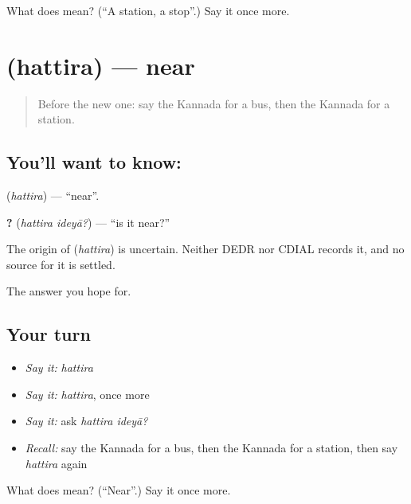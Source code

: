 \begin{tcolorbox}[breakable,colback=teal!4,colframe=teal!35!black,title={Before you move on}]
What does  mean? (\textquotedblleft{}A station, a stop\textquotedblright{}.) Say it once more.
\end{tcolorbox}
\section[\texorpdfstring{\kn{ಹತ್ತಿರ} (hattira)}{ಹತ್ತಿರ (hattira)}]{ (hattira) — near}

\label{lesson:KA-C100-near}



\begin{quote}
Before the new one: say the Kannada for a bus, then the Kannada for a station.
\end{quote}

\subsection*{You'll want to know: }
\textbf{} (\emph{hattira}) — \textquotedblleft{}near\textquotedblright{}.

\textbf{ ?} (\emph{hattira ideyā?}) — \textquotedblleft{}is it near?\textquotedblright{}

\begin{cousinweb}
The origin of \textbf{} (\emph{hattira}) is uncertain. Neither DEDR nor CDIAL records it, and no source for it is settled.
\end{cousinweb}

\begin{grammarlens}[title={What you've built}]
The answer you hope for.
\end{grammarlens}

\subsection*{Your turn}
\begin{itemize}
\raggedright
  \item \emph{Say it:} \emph{hattira}
  \item \emph{Say it:} \emph{hattira}, once more
  \item \emph{Say it:} ask \emph{hattira ideyā?}
  \item \emph{Recall:} say the Kannada for a bus, then the Kannada for a station, then say \emph{hattira} again
\end{itemize}

\begin{tcolorbox}[breakable,colback=teal!4,colframe=teal!35!black,title={Before you move on}]
What does  mean? (\textquotedblleft{}Near\textquotedblright{}.) Say it once more.
\end{tcolorbox}

